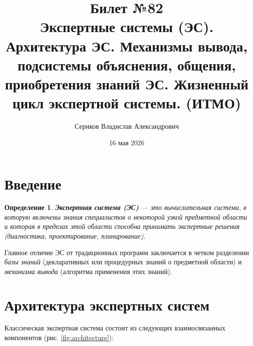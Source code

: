 \documentclass[12pt,a4paper]{article}
\title{Билет №82 \\ \small Экспертные системы (ЭС). Архитектура ЭС. Механизмы вывода, подсистемы объяснения, общения, приобретения знаний ЭС. Жизненный цикл экспертной системы. (ИТМО)}
\author{Сериков Владислав Александрович}
\date{16 мая 2026}
\newtheorem{definition}{Определение}
\begin{document}
\maketitle
\tableofcontents
\newpage

\section{Введение}

\begin{definition}
\textbf{Экспертная система (ЭС)} --- это вычислительная система, в которую включены знания специалистов о некоторой узкой предметной области и которая в пределах этой области способна принимать экспертные решения (диагностика, проектирование, планирование).
\end{definition}

Главное отличие ЭС от традиционных программ заключается в четком разделении \textit{базы знаний} (декларативных или процедурных знаний о предметной области) и \textit{механизма вывода} (алгоритма применения этих знаний).

\section{Архитектура экспертных систем}

Классическая экспертная система состоит из следующих взаимосвязанных компонентов (рис. \ref{fig:architecture}):
\end{document}
